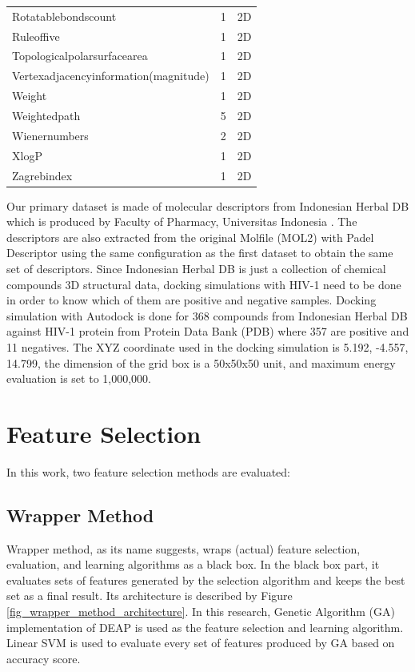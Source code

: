 \documentclass[conference]{IEEEtran}
\begin{document}
\begin{table}
\begin{tabular}{|l|c|c|}
		Rotatablebondscount & 	1  & 2D \\
		Ruleoffive & 	1  & 2D \\
		Topologicalpolarsurfacearea & 	1  & 2D \\
		Vertexadjacencyinformation(magnitude) & 	1  & 2D \\
		Weight & 	1  & 2D \\
		Weightedpath & 	5  & 2D \\
		Wienernumbers & 	2  & 2D \\
		XlogP & 	1  & 2D \\
		Zagrebindex & 	1  & 2D \\	
		\hline 
	\end{tabular} 
\end{table}	

Our primary dataset is made of molecular descriptors from Indonesian Herbal DB which is produced by Faculty of Pharmacy, Universitas Indonesia \cite{yanuar2011medicinal}. The descriptors are also extracted from the original Molfile (MOL2) with Padel Descriptor using the same configuration as the first dataset to obtain the same set of descriptors. Since Indonesian Herbal DB is just a collection of chemical compounds 3D structural data, docking simulations with HIV-1 need to be done in order to know which of them are positive and negative samples. Docking simulation with Autodock is done for 368 compounds from Indonesian Herbal DB against HIV-1 protein from Protein Data Bank (PDB) where 357 are positive and 11 negatives. The XYZ coordinate used in the docking simulation is 5.192, -4.557, 14.799, the dimension of the grid box is a 50x50x50 unit, and maximum energy evaluation is set to 1,000,000.

\section{Feature Selection} \label{Feature Selection}

In this work, two feature selection methods are evaluated:

\subsection{Wrapper Method}

Wrapper method, as its name suggests, wraps (actual) feature selection, evaluation, and learning algorithms as a black box\cite{tang2014feature}. In the black box part, it evaluates sets of features generated by the selection algorithm and keeps the best set as a final result. Its architecture is described by Figure \ref{fig_wrapper_method_architecture}. In this research, Genetic Algorithm (GA) implementation of DEAP \cite{DEAP_JMLR2012} is used as the feature selection and learning algorithm. Linear SVM is used to evaluate every set of features produced by GA based on accuracy score.
\end{document}
